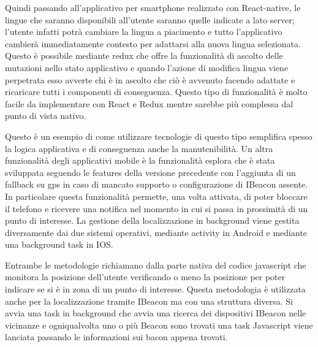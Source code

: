 Quindi passando all’applicativo per smartphone realizzato con React-native, le lingue che saranno disponibili all’utente saranno quelle indicate a lato server; l’utente infatti potrà cambiare la lingua a piacimento e tutto l’applicativo cambierà immediatamente contesto per adattarsi alla nuova lingua selezionata. Questo è possibile mediante redux che offre la funzionalità di ascolto delle mutazioni nello stato applicativo e quando l’azione di modifica lingua viene perpetrata esso avverte chi è in ascolto che ciò è avvenuto facendo adattate e ricaricare tutti i componenti di conseguenza. Questo tipo di funzionalità è molto facile da implementare con React e Redux mentre sarebbe più complessa dal punto di vista nativo. \vspace{5mm}

Questo è un esempio di come utilizzare tecnologie di questo tipo semplifica spesso la logica applicativa e di conseguenza anche la manutenibilità. Un altra funzionalità degli applicativi mobile è la funzionalità esplora che è stata sviluppata seguendo le features della versione precedente con l’aggiunta di un fallback su gps in caso di mancato supporto o configurazione di IBeacon assente. In particolare questa funzionalità permette, una volta attivata, di poter bloccare il telefono e ricevere una notifica nel momento in cui si passa in prossimità di un punto di interesse. La gestione della localizzazione in background viene gestita diversamente dai due sistemi operativi, mediante activity in Android e mediante una background task in IOS. \vspace{5mm}

Entrambe le metodologie richiamano dalla parte nativa del codice javascript che monitora la posizione dell’utente verificando o meno la posizione per poter indicare se si è in zona di un punto di interesse. Questa metodologia è utilizzata anche per la localizzazione tramite IBeacon ma con una struttura diversa. Si avvia una task in background che avvia una ricerca dei dispositivi IBeacon nelle vicinanze e ogniqualvolta uno o più Beacon sono trovati una task Javascript viene lanciata passando le informazioni sui bacon appena trovati. \vspace{5mm}

